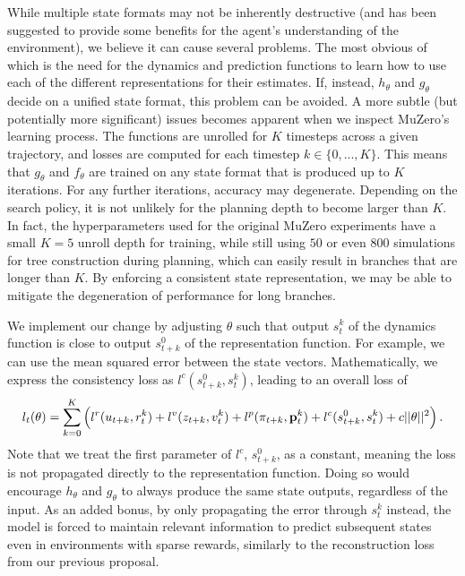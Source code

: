 While multiple state formats may not be inherently destructive (and has been suggested to provide some benefits for the agent's understanding of the environment), we believe it can cause several problems. The most obvious of which is the need for the dynamics and prediction functions to learn how to use each of the different representations for their estimates. If, instead, $h_\theta$ and $g_\theta$ decide on a unified state format, this problem can be avoided. A more subtle (but potentially more significant) issues becomes apparent when we inspect MuZero's learning process. The functions are unrolled for $K$ timesteps across a given trajectory, and losses are computed for each timestep $k \in \{0, ..., K\}$. This means that $g_\theta$ and $f_\theta$ are trained on any state format that is produced up to $K$ iterations. For any further iterations, accuracy may degenerate. Depending on the search policy, it is not unlikely for the planning depth to become larger than $K$. In fact, the hyperparameters used for the original MuZero experiments have a small $K=5$ unroll depth for training, while still using $50$ or even $800$ simulations for tree construction during planning, which can easily result in branches that are longer than $K$. By enforcing a consistent state representation, we may be able to mitigate the degeneration of performance for long branches.

We implement our change by adjusting $\theta$ such that output $s^k_t$ of the dynamics function is close to output $s^0_{t+k}$ of the representation function. For example, we can use the mean squared error between the state vectors. Mathematically, we express the consistency loss as $l^c(s^0_{t+k}, s^k_t)$, leading to an overall loss of
\begin{equation*}
    l_t(\theta) = \sum^K_{k=0} \left(l^r(u_{t+k}, r_t^k) + l^v(z_{t+k}, v_t^k) + l^p(\pi_{t+k}, \text{\textbf{p}}_t^k) + l^c(s^0_{t+k}, s^k_t) + c||\theta||^2\right).
\end{equation*}
Note that we treat the first parameter of $l^c$, $s^0_{t+k}$, as a constant, meaning the loss is not propagated directly to the representation function. Doing so would encourage $h_\theta$ and $g_\theta$ to always produce the same state outputs, regardless of the input. As an added bonus, by only propagating the error through $s_t^k$ instead, the model is forced to maintain relevant information to predict subsequent states even in environments with sparse rewards, similarly to the reconstruction loss from our previous proposal.